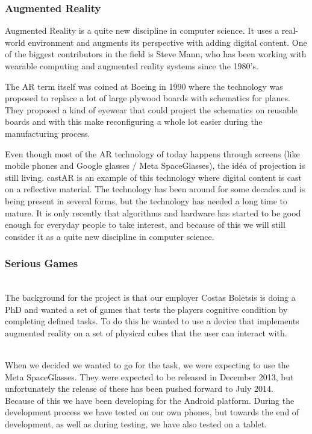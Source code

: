 \subsubsection{Augmented Reality}

\gls{Augmented Reality} is a quite new discipline in computer science. It uses
a real-world environment and augments its perspective with adding digital
content. One of the biggest contributors in the field is Steve Mann, who has been
working with wearable computing and augmented reality systems since the 1980's.

The \gls{AR} term itself was coined at Boeing\cite{boeingAR} in 1990 where the
technology was
proposed to replace a lot of large plywood boards with schematics for planes.
They proposed a kind of eyewear that could project the schematics on reusable
boards and with this make reconfiguring a whole lot easier during the
manufacturing process.

Even though most of the AR technology of today happens through screens (like
mobile phones and Google glasses / Meta SpaceGlasses\cite{MetaSpaceGlasses}),
the id\'{e}a of projection is still living. castAR is an example of this 
technology where digital content is cast on a reflective material.
The technology has been around for some decades and is being present in several
forms, but the technology has needed a long time to mature. It is only recently
that algorithms and hardware has started to be good enough for everyday people
to take interest, and because of this we will still consider it as a quite new 
discipline in computer science.

\subsubsection{Serious Games}

\\

The background for the project is that our employer Costas Boletsis is doing
a PhD and wanted a set of games that tests the players cognitive condition
by completing defined tasks. To do this he wanted to use a device that
implements augmented reality on a set of physical cubes that the user can
interact with.

\\
When we decided we wanted to go for the task, we were expecting to use the
Meta SpaceGlasses. They were expected to be released in December 2013, but
unfortunately the release of these has been pushed forward to July
2014\cite{MetaSpaceGlasses}.
\\
Because of this we have been developing for the Android platform. During the
development process we have tested on our own phones, but towards the end
of development, as well as during testing, we have also tested on a tablet.

